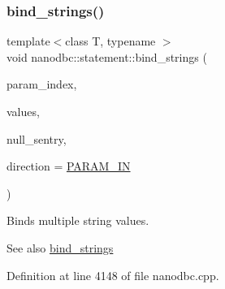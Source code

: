 \subsubsection{\texorpdfstring{bind\_strings()}{bind\_strings()}\hspace{0.1cm}{\footnotesize\ttfamily [5/9]}}
{\footnotesize\ttfamily template$<$class T, typename $>$ \\
void nanodbc\+::statement\+::bind\+\_\+strings (\begin{DoxyParamCaption}\item[{short}]{param\+\_\+index,  }\item[{std\+::vector$<$ T $>$ const \&}]{values,  }\item[{typename T\+::value\+\_\+type const $\ast$}]{null\+\_\+sentry,  }\item[{\mbox{\hyperlink{classnanodbc_1_1statement_a523142f53cbbee8d68a074da993e7fa6}{param\+\_\+direction}}}]{direction = {\ttfamily \mbox{\hyperlink{classnanodbc_1_1statement_a523142f53cbbee8d68a074da993e7fa6ae33f42ce0677d00c291ff4d8e39f99de}{P\+A\+R\+A\+M\+\_\+\+IN}}} }\end{DoxyParamCaption})}



Binds multiple string values. 

\begin{DoxySeeAlso}{See also}
\mbox{\hyperlink{group__bind__strings_ga8914c229f28ee7b02cf1b85684741326}{bind\+\_\+strings}} 
\end{DoxySeeAlso}


Definition at line 4148 of file nanodbc.\+cpp.

\mbox{\label{group__bind__strings_gaeb56183ce0f1c8a213b3088b8b03b6ff}} 
